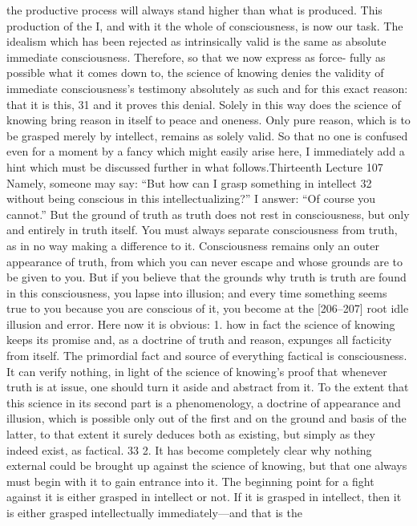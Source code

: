 the productive process will always stand higher than what is produced. This
production of the I, and with it the whole of consciousness, is now our task.
The idealism which has been rejected as intrinsically valid is the same as
absolute immediate consciousness. Therefore, so that we now express as force-
fully as possible what it comes down to, the science of knowing denies the
validity of immediate consciousness’s testimony absolutely as such and for this
exact reason: that it is this, 31 and it proves this denial. Solely in this way does
the science of knowing bring reason in itself to peace and oneness. Only pure
reason, which is to be grasped merely by intellect, remains as solely valid. So
that no one is confused even for a moment by a fancy which might easily arise
here, I immediately add a hint which must be discussed further in what follows.Thirteenth Lecture
107
Namely, someone may say: “But how can I grasp something in intellect 32 without
being conscious in this intellectualizing?” I answer: “Of course you cannot.” But
the ground of truth as truth does not rest in consciousness, but only and
entirely in truth itself. You must always separate consciousness from truth, as
in no way making a difference to it. Consciousness remains only an outer
appearance of truth, from which you can never escape and whose grounds are
to be given to you. But if you believe that the grounds why truth is truth are
found in this consciousness, you lapse into illusion; and every time something
seems true to you because you are conscious of it, you become at the [206–207]
root idle illusion and error. Here now it is obvious: 1. how in fact the science
of knowing keeps its promise and, as a doctrine of truth and reason, expunges
all facticity from itself. The primordial fact and source of everything factical is
consciousness. It can verify nothing, in light of the science of knowing’s proof
that whenever truth is at issue, one should turn it aside and abstract from it. To
the extent that this science in its second part is a phenomenology, a doctrine of
appearance and illusion, which is possible only out of the first and on the
ground and basis of the latter, to that extent it surely deduces both as existing,
but simply as they indeed exist, as factical. 33 2. It has become completely clear
why nothing external could be brought up against the science of knowing, but
that one always must begin with it to gain entrance into it. The beginning
point for a fight against it is either grasped in intellect or not. If it is grasped in
intellect, then it is either grasped intellectually immediately—and that is the

